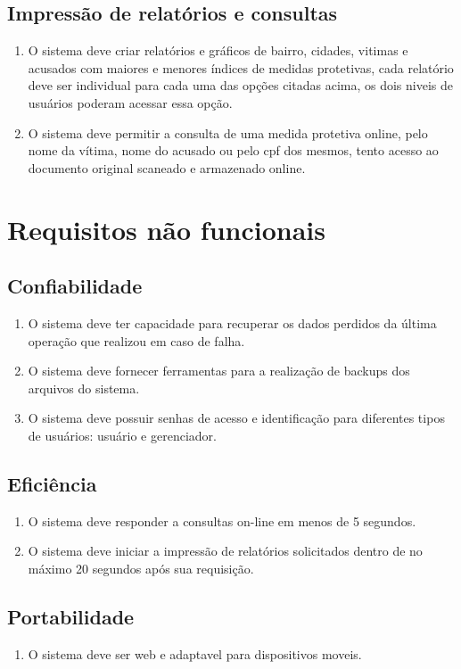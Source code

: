 \documentclass[
	12pt,				%
    oneside,			%
	a4paper,			%
	english,			%
	french,				%
	spanish,			%
	brazil,				%
	]{abntex2}
\begin{document}
		\subsection{Impressão de relatórios e consultas}\label{RF3}
			\begin{enumerate}
				\item O sistema deve criar relatórios e gráficos de bairro, cidades, vitimas e acusados com maiores e menores índices de medidas protetivas, cada relatório deve ser individual para cada uma das opções citadas acima, os dois niveis de usuários poderam acessar essa opção.
				\item O sistema deve permitir a consulta de uma medida protetiva online, pelo nome da vítima, nome do acusado ou pelo cpf dos mesmos, tento acesso ao documento original scaneado e armazenado online.
			\end{enumerate}
	

	\section{Requisitos não funcionais}
	
		\subsection{Confiabilidade}
			\begin{enumerate}
				\item O sistema deve ter capacidade para recuperar os dados perdidos da última operação que realizou em caso de falha.
				\item O sistema deve fornecer ferramentas para a realização de backups dos arquivos do sistema.
				\item O sistema deve possuir senhas de acesso e identificação para diferentes tipos de usuários: usuário e gerenciador.
			\end{enumerate}

	
		\subsection{Eficiência}
			\begin{enumerate}
				\item O sistema deve responder a consultas on-line em menos de 5 segundos.
				\item O sistema deve iniciar a impressão de relatórios solicitados dentro de no máximo 20 segundos após sua requisição.
			\end{enumerate}
		\subsection{Portabilidade}
			\begin{enumerate}
				\item O sistema deve ser web e adaptavel para dispositivos moveis.
			\end{enumerate}
\end{document}
